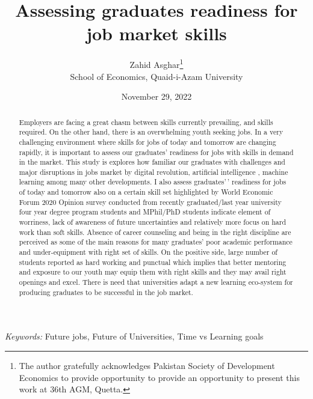 \documentclass[
  12pt]{article}
\begin{document}
\def\spacingset#1{\renewcommand{\baselinestretch}%
{#1}\small\normalsize} \spacingset{1}



\date{November 29, 2022}
\title{\bf Assessing graduates readiness for job market skills}
\author{
Zahid Asghar\thanks{The author gratefully acknowledges Pakistan Society
of Development Economics to provide opportunity to provide an
opportunity to present this work at 36th AGM, Quetta.}\\
School of Economics, Quaid-i-Azam University\\
}
\maketitle

\bigskip
\bigskip
\begin{abstract}
Employers are facing a great chasm between skills currently prevailing,
and skills required. On the other hand, there is an overwhelming youth
seeking jobs. In a very challenging environment where skills for jobs of
today and tomorrow are changing rapidly, it is important to assess our
graduates' readiness for jobs with skills in demand in the market. This
study is explores how familiar our graduates with challenges and major
disruptions in jobs market by digital revolution, artificial
intelligence , machine learning among many other developments. I also
assess graduates'\,' readiness for jobs of today and tomorrow also on a
certain skill set highlighted by World Economic Forum 2020 Opinion
survey conducted from recently graduated/last year university four year
degree program students and MPhil/PhD students indicate element of
worriness, lack of awareness of future uncertainties and relatively more
focus on hard work than soft skills. Absence of career counseling and
being in the right discipline are perceived as some of the main reasons
for many graduates' poor academic performance and under-equipment with
right set of skills. On the positive side, large number of students
reported as hard working and punctual which implies that better
mentoring and exposure to our youth may equip them with right skills and
they may avail right openings and excel. There is need that universities
adapt a new learning eco-system for producing graduates to be successful
in the job market.
\end{abstract}

\noindent%
{\it Keywords:} Future jobs, Future of Universities, Time vs Learning
goals
\vfill
\end{document}
